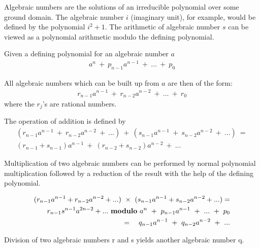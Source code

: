 

Algebraic numbers are the solutions of an irreducible polynomial over
some ground domain.   The algebraic number $i$ (imaginary
unit),  for example, would be defined by the
polynomial $i^2 + 1$.  The arithmetic of algebraic number $s$ can be
viewed as a polynomial arithmetic modulo the defining polynomial.

Given a defining polynomial for an algebraic number $a$
\begin{eqnarray*}
a^n ~ + ~ {p _{n-1}} {a ^ {n -1}} ~ + ~ ... ~ + ~ {p_0}
\end{eqnarray*}

All algebraic numbers which can be built up from $a$ are then of the form:
\begin{eqnarray*}
{r_{n-1}} {a ^{n-1}} ~+~ {r_{n-2}} {a ^{n-2}} ~+~ ... ~+~ {r_0}
\end{eqnarray*}
where the $r_j$'s are rational numbers.

The operation of addition is defined by
\begin{eqnarray*}
({r_{n-1}} {a ^{n-1}} ~+~ {r_{n-2}} {a ^{n-2}} ~+~ ...) ~ + ~
({s_{n-1}} {a ^{n-1}} ~+~ {s_{n-2}} {a ^{n-2}} ~+~ ...) ~ =  \\
({r_{n-1}+s_{n-1}}) {a ^{n-1}} ~+~ ({r_{n-2}+s_{n-2}}) {a ^{n-2}} ~+~ ...
\end{eqnarray*}

Multiplication of two algebraic numbers can be performed by normal
polynomial multiplication followed by a reduction of the result with the
help of the defining polynomial.

\begin{eqnarray*}
({r_{n-1}} {a ^{n-1}} + {r_{n-2}} {a ^{n-2}} + ...) ~ \times ~
({s_{n-1}} {a ^{n-1}} + {s_{n-2}} {a ^{n-2}} + ...) = \\
 {r_{n-1}} {s ^{n-1}}{a^{2n-2}} +  ... ~ {\bf modulo} ~
a^n ~ + ~ {p _{n-1}} {a ^ {n -1}} ~ + ~ ... ~ + ~ {p_0} \\
= ~~~{q_{n-1}} a^{n-1} ~ + ~ {q _{n-2}} {a ^ {n -2}} ~ + ~ ...
\end{eqnarray*}

Division of two algebraic numbers r and s yields another algebraic number q.

